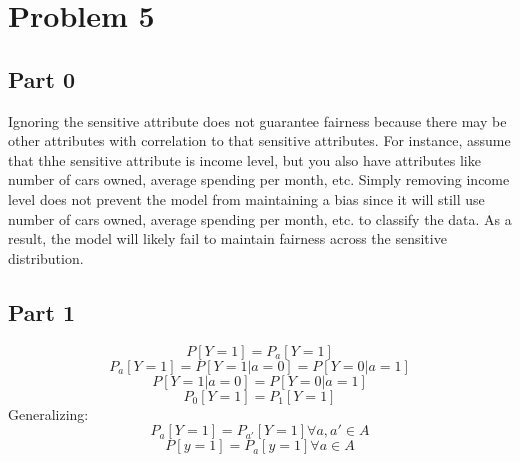 \documentclass[twoside,11pt]{homework}
\begin{document}
\section*{Problem 5}
\subsection*{Part 0}
	Ignoring the sensitive attribute does not guarantee fairness because there may be 
	other attributes with correlation to that sensitive attributes. 
	For instance, assume that thhe sensitive attribute is income level, 
	but you also have attributes like number of cars owned, average spending per month, etc. 
	Simply removing income level does not prevent the model from maintaining a bias since it will still use 
	number of cars owned, average spending per month, etc. to classify the data. As a result, 
	the model will likely fail to maintain fairness across the sensitive distribution.
\subsection*{Part 1}  
	$$P[Y=1]=P_a[Y=1]$$ 
	$$P_a[Y=1]=P[Y=1|a=0]=P[Y=0|a=1]$$
	$$P[Y=1|a=0]=P[Y=0|a=1]$$
	$$P_0[Y=1]=P_1[Y=1]$$
	Generalizing:
	$$P_{a}[Y=1] = P_{a'}[Y=1] \forall a, a ' \in A$$
	$$P[y=1] = P_a[y=1] \forall a \in A$$\\
\end{document}
